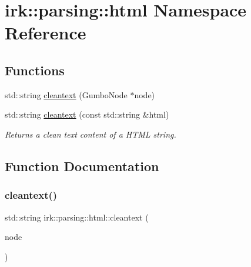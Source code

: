 \hypertarget{namespaceirk_1_1parsing_1_1html}{}\section{irk\+:\+:parsing\+:\+:html Namespace Reference}
\label{namespaceirk_1_1parsing_1_1html}
\subsection*{Functions}
\begin{DoxyCompactItemize}
\item 
std\+::string \mbox{\hyperlink{namespaceirk_1_1parsing_1_1html_a7ed9d1cea0e6298c682b56cb66ad7167}{cleantext}} (Gumbo\+Node $\ast$node)
\item 
std\+::string \mbox{\hyperlink{namespaceirk_1_1parsing_1_1html_a46fc4eebd2e7d9bd3b313dcb216355ee}{cleantext}} (const std\+::string \&html)
\begin{DoxyCompactList}\small\item\em Returns a clean text content of a H\+T\+ML string. \end{DoxyCompactList}\end{DoxyCompactItemize}


\subsection{Function Documentation}
\mbox{\label{namespaceirk_1_1parsing_1_1html_a7ed9d1cea0e6298c682b56cb66ad7167}} 
\subsubsection{\texorpdfstring{cleantext()}{cleantext()}\hspace{0.1cm}{\footnotesize\ttfamily [1/2]}}
{\footnotesize\ttfamily std\+::string irk\+::parsing\+::html\+::cleantext (\begin{DoxyParamCaption}\item[{Gumbo\+Node $\ast$}]{node }\end{DoxyParamCaption})}

\mbox{\label{namespaceirk_1_1parsing_1_1html_a46fc4eebd2e7d9bd3b313dcb216355ee}} 
